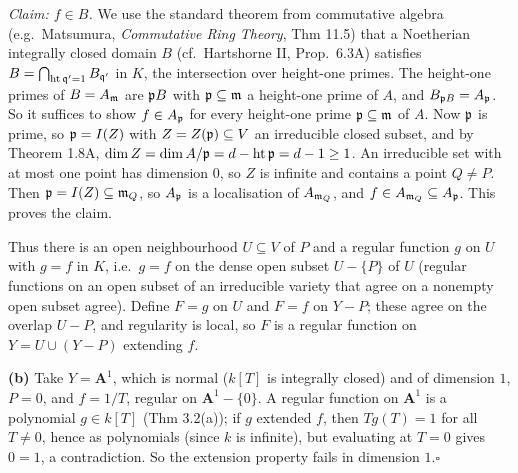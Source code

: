 \documentclass[11pt]{article}
\begin{document}
\emph{Claim: $f\in B$.} We use the standard theorem from commutative algebra (e.g.\ Matsumura, \emph{Commutative Ring Theory}, Thm 11.5) that a Noetherian integrally closed domain $B$ (cf.\ Hartshorne II, Prop.~6.3A) satisfies $B=\bigcap_{\operatorname{ht}\mathfrak q'=1}B_{\mathfrak q'}$ in $K$, the intersection over height-one primes. The height-one primes of $B=A_\mathfrak m$ are $\mathfrak p B$ with $\mathfrak p\subseteq\mathfrak m$ a height-one prime of $A$, and $B_{\mathfrak p B}=A_\mathfrak p$. So it suffices to show $f\in A_\mathfrak p$ for every height-one prime $\mathfrak p\subseteq\mathfrak m$ of $A$. Now $\mathfrak p$ is prime, so $\mathfrak p=I(Z)$ with $Z=Z(\mathfrak p)\subseteq V$ an irreducible closed subset, and by Theorem 1.8A, $\dim Z=\dim A/\mathfrak p=d-\operatorname{ht}\mathfrak p=d-1\ge1$. An irreducible set with at most one point has dimension $0$, so $Z$ is infinite and contains a point $Q\ne P$. Then $\mathfrak p=I(Z)\subseteq\mathfrak m_Q$, so $A_\mathfrak p$ is a localisation of $A_{\mathfrak m_Q}$, and $f\in A_{\mathfrak m_Q}\subseteq A_\mathfrak p$. This proves the claim.

Thus there is an open neighbourhood $U\subseteq V$ of $P$ and a regular function $g$ on $U$ with $g=f$ in $K$, i.e.\ $g=f$ on the dense open subset $U-\{P\}$ of $U$ (regular functions on an open subset of an irreducible variety that agree on a nonempty open subset agree). Define $F=g$ on $U$ and $F=f$ on $Y-P$; these agree on the overlap $U-P$, and regularity is local, so $F$ is a regular function on $Y=U\cup(Y-P)$ extending $f$.

\textbf{(b)} Take $Y=\mathbf A^1$, which is normal ($k[T]$ is integrally closed) and of dimension $1$, $P=0$, and $f=1/T$, regular on $\mathbf A^1-\{0\}$. A regular function on $\mathbf A^1$ is a polynomial $g\in k[T]$ (Thm 3.2(a)); if $g$ extended $f$, then $Tg(T)=1$ for all $T\neq0$, hence as polynomials (since $k$ is infinite), but evaluating at $T=0$ gives $0=1$, a contradiction. So the extension property fails in dimension $1$.\hfill$\square$
\end{document}
